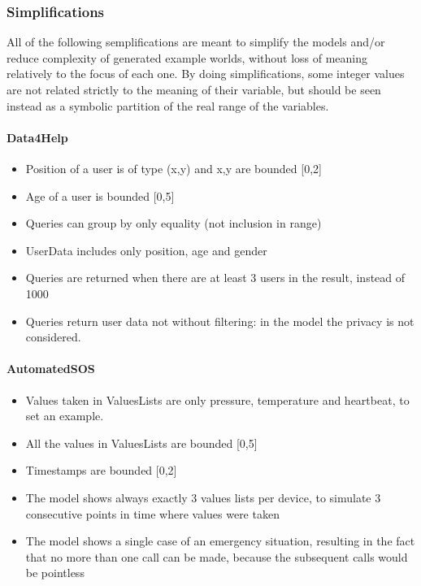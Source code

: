 {\color{secblue}\subsubsection{Simplifications}}
All of the following semplifications are meant to simplify the models and/or reduce complexity of generated example worlds, without loss of meaning relatively to the focus of each one.
By doing simplifications, some integer values are not related strictly to the meaning of their variable, but should be seen instead as a symbolic partition of the real range of the variables.

\paragraph{Data4Help}
\begin{itemize}
\item Position of a user is of type (x,y) and x,y are bounded [0,2]
\item Age of a user is bounded [0,5]
\item Queries can group by only equality (not inclusion in range)
\item UserData includes only position, age and gender
\item Queries are returned when there are at least 3 users in the result, instead of 1000
\item Queries return user data not without filtering: in the model the privacy is not considered.
\end{itemize}

\paragraph{AutomatedSOS}
\begin{itemize}
\item Values taken in ValuesLists are only pressure, temperature and heartbeat, to set an example.
\item All the values in ValuesLists are bounded [0,5]
\item Timestamps are bounded [0,2]
\item The model shows always exactly 3 values lists per device, to simulate 3 consecutive points in time where values were taken
\item The model shows a single case of an emergency situation, resulting in the fact that no more than one call can be made, because the subsequent calls would be pointless
\end{itemize}

